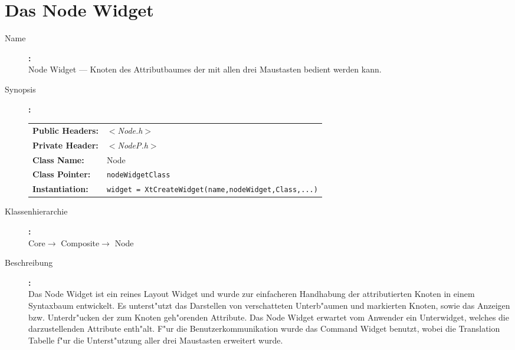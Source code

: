 
\section{Das Node Widget}

\begin{description}

\item[Name] 
   {\bf:\\}
   Node Widget --- Knoten des Attributbaumes der mit allen drei Maustasten 
   bedient werden kann.

\item[Synopsis]
   {\bf:\\}
   \begin{tabular}{ll}
   {\bf Public Headers:} & {\it $<$Node.h$>$} \\
   {\bf Private Header:} & {\it $<$NodeP.h$>$} \\
   {\bf Class Name:} & Node \\
   {\bf Class Pointer:} & {\tt nodeWidgetClass} \\
   {\bf Instantiation:} & 
		 {\tt widget = XtCreateWidget(name,nodeWidget,Class,...)}
   \end{tabular}

\item[Klassenhierarchie]
   {\bf:\\}
   Core$\rightarrow$ Composite$\rightarrow$ Node

\item[Beschreibung]
   {\bf:\\}
   Das Node Widget ist ein reines Layout Widget und wurde zur 
   einfacheren Handhabung der attributierten 
   Knoten in einem Syntaxbaum entwickelt. Es unterst"utzt das Darstellen
   von verschatteten Unterb"aumen und markierten Knoten,
   sowie das Anzeigen bzw. Unterdr"ucken
   der zum Knoten geh"orenden Attribute. Das Node Widget erwartet vom
   Anwender ein Unterwidget, welches die darzustellenden Attribute enth"alt.
   F"ur die Benutzerkommunikation wurde das Command Widget benutzt, wobei
   die Translation Tabelle f"ur die Unterst"utzung aller drei Maustasten
   erweitert wurde.


\end{description}
